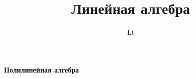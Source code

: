 \documentclass{report}
\title{\Huge{Линейная алгебра}}
\author{\huge{Lt}}
\date{}
\begin{document}
\tableofcontents
\maketitle
\textbf{\huge{Полилинейная алгебра}}
\section{\textbf{}}
\end{document}

